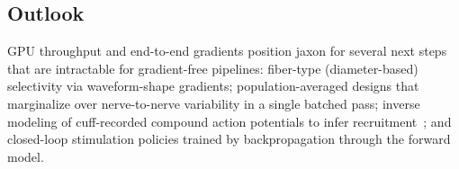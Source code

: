 \subsection{Outlook}

GPU throughput and end-to-end gradients position jaxon for several
next steps that are intractable for gradient-free pipelines:
fiber-type (diameter-based) selectivity via waveform-shape gradients;
population-averaged designs that marginalize over nerve-to-nerve
variability in a single batched pass; inverse modeling of cuff-recorded
compound action potentials to infer
recruitment~\cite{vissamsetti2025cap,eiber2021visceral};
and closed-loop stimulation policies trained by backpropagation through
the forward model.
